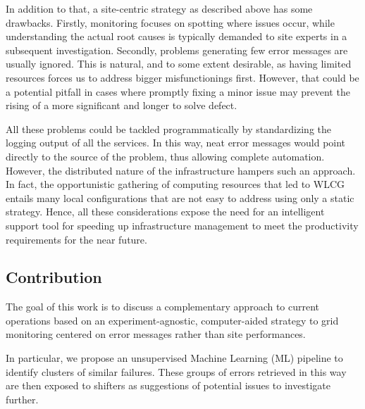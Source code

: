 In addition to that, a site-centric strategy as described above has some drawbacks. Firstly, monitoring focuses on spotting where issues occur, while understanding the actual root causes is typically demanded to site experts in a subsequent investigation.
Secondly, problems generating few error messages are usually ignored. This is natural, and to some extent desirable, as having limited resources forces us to address bigger misfunctionings first. However, that could be a potential pitfall in cases where promptly fixing a minor issue may prevent the rising of a more significant and longer to solve defect.

All these problems could be tackled programmatically by standardizing the logging output of all the services. In this way, neat error messages would point directly to the source of the problem, thus allowing complete automation. 
However, the distributed nature of the infrastructure hampers such an approach.
In fact, the opportunistic gathering of computing resources that led to WLCG entails many local configurations that are not easy to address using only a static strategy.
Hence, all these considerations expose the need for an intelligent support tool for speeding up infrastructure management to meet the productivity requirements for the near future.


\subsection{Contribution}
The goal of this work is to discuss a complementary approach to current operations based on an experiment-agnostic, computer-aided strategy to grid monitoring centered on error messages rather than site performances.

In particular, we propose an unsupervised Machine Learning (ML) pipeline to identify clusters of similar failures. These groups of errors retrieved in this way are then exposed to shifters as suggestions of potential issues to investigate further.

